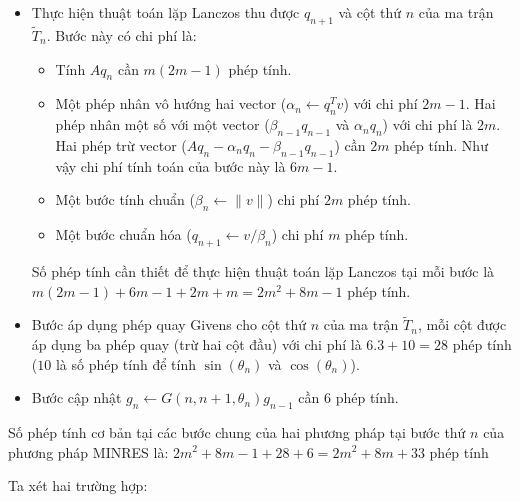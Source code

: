 \documentclass[14pt, a4paper]{article}
\numberwithin{equation}{section}
\numberwithin{algorithm}{section}
\numberwithin{figure}{section}
\numberwithin{dl}{section}
\numberwithin{md}{section}
\numberwithin{bd}{section}
\numberwithin{dn}{section}
\begin{document}
\begin{itemize}
    \item Thực hiện thuật toán lặp Lanczos thu được $q_{n+1}$ và cột thứ $n$ của ma trận $\widetilde{T}_n$. Bước này có chi phí là:
    \begin{itemize}
        \item Tính $Aq_n$ cần $m(2m-1)$ phép tính.
        \item Một phép nhân vô hướng hai vector ($\alpha_n \leftarrow q_n^Tv$) với chi phí $2m-1$. Hai phép nhân một số với một vector ($\beta_{n-1}q_{n-1}$ và $\alpha_n q_n$) với chi phí là $2m$. Hai phép trừ vector ($Aq_n - \alpha_n q_n - \beta_{n-1} q_{n-1}$) cần $2m$ phép tính. Như vậy chi phí tính toán của bước này là $6m-1$.
        \item Một bước tính chuẩn ($\beta_n \leftarrow \lVert v \rVert$) chi phí $2m$ phép tính.
        \item Một bước chuẩn hóa ($q_{n+1} \leftarrow v/\beta_n$) chi phí $m$ phép tính.
    \end{itemize}
    Số phép tính cần thiết để thực hiện thuật toán lặp Lanczos tại mỗi bước là $m(2m-1) + 6m-1 + 2m + m=2m^2+8m-1$ phép tính.
    \item Bước áp dụng phép quay Givens cho cột thứ $n$ của ma trận $\widetilde{T}_n$, mỗi cột được áp dụng ba phép quay (trừ hai cột đầu) với chi phí là $6.3+10=28$ phép tính ($10$ là số phép tính để tính $\sin(\theta_n)$ và $\cos(\theta_n)$).
    \item Bước cập nhật $g_n \leftarrow G(n, n+1, \theta_n)g_{n-1}$ cần 6 phép tính.
\end{itemize}
Số phép tính cơ bản tại các bước chung của hai phương pháp tại bước thứ $n$ của phương pháp MINRES là: $2m^2 + 8m-1 + 28 + 6=2m^2 + 8m + 33$ phép tính

Ta xét hai trường hợp:
\end{document}
